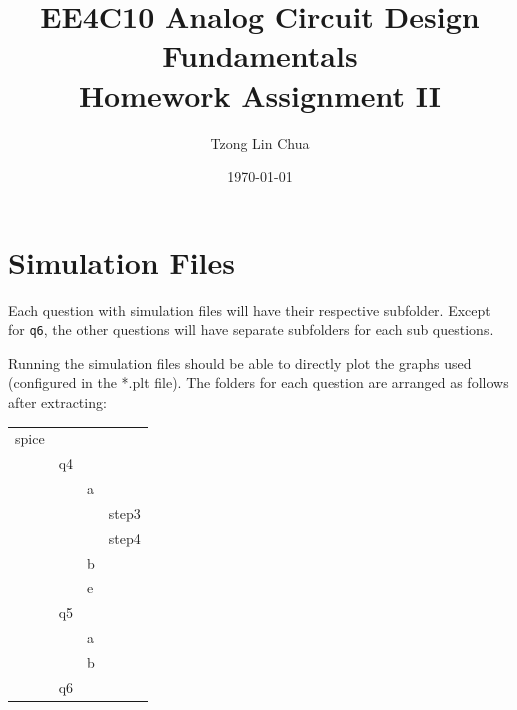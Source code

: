\documentclass{article}
\author{Tzong Lin Chua}
\date{\today}
\title{EE4C10 Analog Circuit Design Fundamentals\\\medskip
\large Homework Assignment II }
\begin{document}
\maketitle
\tableofcontents


\section{Simulation Files}
\label{sec:org8009e0f}
Each question with simulation files will have their respective subfolder.
Except for \texttt{q6}, the other questions will have separate subfolders for each sub questions.

Running the simulation files should be able to directly plot the graphs used (configured in the *.plt file).
The folders for each question are arranged as follows after extracting:

\begin{center}
\begin{tabular}{llll}
\hline
spice &  &  & \\
 & q4 &  & \\
 &  & a & \\
 &  &  & step3\\
 &  &  & step4\\
 &  & b & \\
 &  & e & \\
 & q5 &  & \\
 &  & a & \\
 &  & b & \\
 & q6 &  & \\
\hline
\end{tabular}
\end{center}
\end{document}
